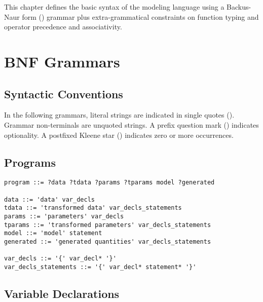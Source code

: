 \noindent
This chapter defines the basic syntax of the \Stan modeling language
using a Backus-Naur form (\BNF) grammar plus extra-grammatical
constraints on function typing and operator precedence and
associativity.


\section{BNF Grammars}

\subsection{Syntactic Conventions}

In the following \BNF grammars, literal strings are indicated in
single quotes ().  Grammar non-terminals are unquoted strings.
A prefix question mark ()  indicates optionality.  A postfixed
Kleene star (\code{*}) indicates zero or more occurrences.

\subsection{Programs}

{\small
\begin{Verbatim}[fontsize=\small]
program ::= ?data ?tdata ?params ?tparams model ?generated

data ::= 'data' var_decls
tdata ::= 'transformed data' var_decls_statements
params ::= 'parameters' var_decls
tparams ::= 'transformed parameters' var_decls_statements
model ::= 'model' statement
generated ::= 'generated quantities' var_decls_statements

var_decls ::= '{' var_decl* '}'
var_decls_statements ::= '{' var_decl* statement* '}'
\end{Verbatim}
}

\subsection{Variable Declarations}

